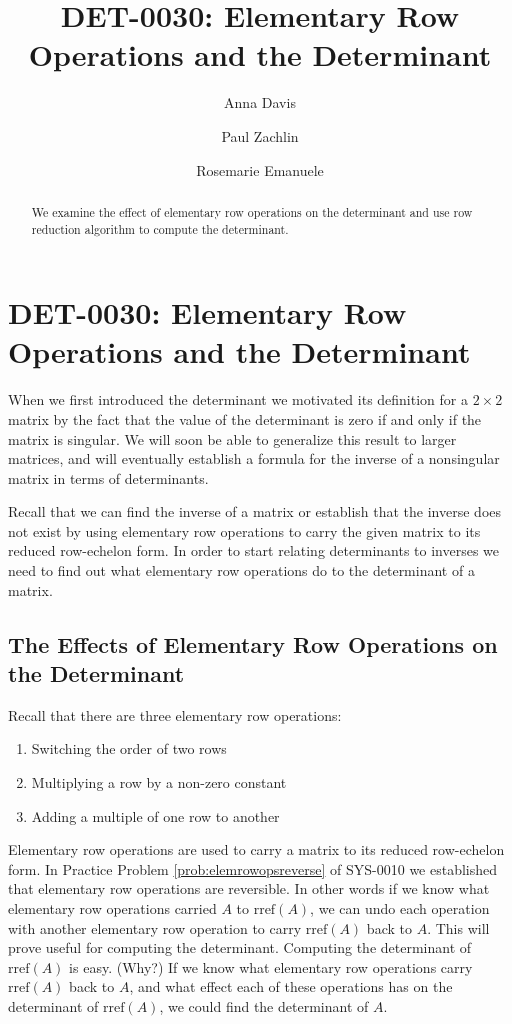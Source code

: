 \documentclass{ximera}
\author{Anna Davis \and Paul Zachlin \and Rosemarie Emanuele} \title{DET-0030: Elementary Row Operations and the Determinant} \license{CC-BY 4.0}
\begin{document}
\begin{abstract}
 We examine the effect of elementary row operations on the determinant and use row reduction algorithm to compute the determinant.
\end{abstract}
\maketitle

\section*{DET-0030: Elementary Row Operations and the Determinant}
When we first introduced the determinant we motivated its definition for a $2\times 2$ matrix by the fact that the value of the determinant is zero if and only if the matrix is singular.  We will soon be able to generalize this result to larger matrices, and will eventually establish a formula for the inverse of a nonsingular matrix in terms of determinants.  

Recall that we can find the inverse of a matrix or establish that the inverse does not exist by using elementary row operations to carry the given matrix to its reduced row-echelon form.  In order to start relating determinants to inverses we need to find out what elementary row operations do to the determinant of a matrix.  

\subsection*{The Effects of Elementary Row Operations on the Determinant}
Recall that there are three elementary row operations:
\begin{enumerate}
\item Switching the order of two rows
\item Multiplying a row by a non-zero constant
\item Adding a multiple of one row to another
\end{enumerate}

Elementary row operations are used to carry a matrix to its reduced row-echelon form.  In Practice Problem \ref{prob:elemrowopsreverse} of SYS-0010 we established that elementary row operations are reversible.  In other words if we know what elementary row operations   carried $A$ to $\mbox{rref}(A)$, we can undo each operation with another elementary row operation to carry $\mbox{rref}(A)$ back to $A$.  This will prove useful for computing the determinant.  Computing the determinant of $\mbox{rref}(A)$ is easy. (Why?)  If we know what elementary row operations carry $\mbox{rref}(A)$ back to $A$, and what effect each of these operations has on the determinant of $\mbox{rref}(A)$, we could find the determinant of $A$.  
\end{document}
